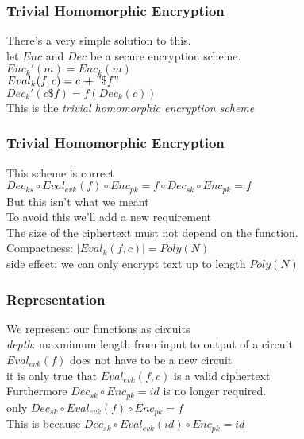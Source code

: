 \begin{frame}
\frametitle{Trivial Homomorphic Encryption}
There's a very simple solution to this.\\
\pause
let $Enc$ and $Dec$ be a secure encryption scheme.\\
$\ $\\
\pause
$Enc_k'(m) = Enc_k(m)$ \\
\pause
$Eval_k(f,c) = c \mathbin{+\mkern-10mu+} "\$f"$ \\
\pause
$Dec_k'(c\$f) = f(Dec_k(c))$ \\
$\ $\\
\pause
This is the \textit{trivial homomorphic encryption scheme}\\

\end{frame}

\begin{frame}
\frametitle{Trivial Homomorphic Encryption}

This scheme is correct\\
$\ $\\
\pause
$Dec_{ks} \circ Eval_{evk}(f) \circ Enc_{pk} = f \circ Dec_{sk} \circ Enc_{pk} = f$\\
$\ $\\
\pause
But this isn't what we meant\\
$\ $\\
\pause
To avoid this we'll add a new requirement\\
The size of the ciphertext must not depend on the function.\\
Compactness: $|Eval_k(f,c)| = Poly(N)$\\
$\ $\\
\pause
side effect: we can only encrypt text up to length $Poly(N)$\\

\end{frame}

\begin{frame}
\frametitle{Representation}
We represent our functions as circuits\\
$\ $\\
\pause
\textit{depth}: maxmimum length from input to output of a circuit\\
$\ $\\
\pause
$Eval_{evk}(f)$ does not have to be a new circuit\\
it is only true that $Eval_{evk}(f,c)$ is a valid ciphertext\\
$\ $\\
\pause
Furthermore $Dec_{sk}\circ Enc_{pk} = id$ is no longer required.\\
only $Dec_{sk}\circ Eval_{evk}(f) \circ Enc_{pk} = f$\\
$\ $\\
This is because $Dec_{sk}\circ Eval_{evk}(id) \circ Enc_{pk} = id$\\
\end{frame}

